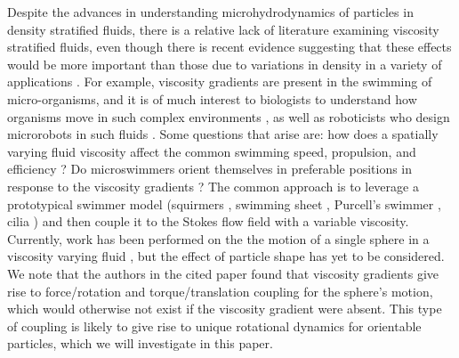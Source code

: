 \documentclass{jfm}
\begin{document}
Despite the advances in understanding microhydrodynamics of particles in density stratified fluids, there is a relative lack of literature examining viscosity stratified fluids, even though there is recent evidence suggesting that these effects would be more important than those due to variations in density in a variety of applications \citep{Dandekar_Ardekani_Swimming_Sheet_Viscosity,Jacquemin_Chemistry}.  For example, viscosity gradients are present in the swimming of micro-organisms, and it is of much interest to biologists to understand how organisms move in such complex environments \citep{Hatwalne_PRL_2004,Liebchen_PRL_2018,Rafai_Effective_Microswimmer,Sokolov_PRL_2009}, as well as roboticists who design microrobots in such fluids \citep{Zhuang_Sitti_2017,Nelson_Kalkiaoos_Abbott_AnnualReview,Kim_Lee_LeeNelson_Zhang_Choi_2016,Cilia_Swimming_2,Cilia_1,Microrobots_Science_Robotics}.  Some questions that arise are: how does a spatially varying fluid viscosity affect the common swimming speed, propulsion, and efficiency \citep{Swimming_Cost_ShearThinning}? Do microswimmers orient themselves in preferable positions in response to the viscosity gradients \citep{Swimming_Orientation}? The common approach is to leverage a prototypical swimmer model (squirmers \citep{Vaseem_Elfring_Viscosity,Datt_Elfring_Viscosity_Gradient}, swimming sheet \citep{Dandekar_Ardekani_Swimming_Sheet_Viscosity, Eastham_Schoele_2020PRF}, Purcell's  swimmer \citep{Pak_PurcellSwimmer}, cilia \citep{Cilia_1,Cilia_Swimming_2}) and then couple it to the Stokes flow field with a variable viscosity.  Currently, work has been performed on the the motion of a single sphere in a viscosity varying fluid \citep{ Datt_Elfring_Viscosity_Gradient}, but the effect of particle shape has yet to be considered.  We note that the authors in the cited paper found that viscosity gradients give rise to force/rotation and torque/translation coupling for the sphere’s motion, which would otherwise not exist if the viscosity gradient were absent.  This type of coupling is likely to give rise to unique rotational dynamics for orientable particles, which we will investigate in this paper.
\end{document}
